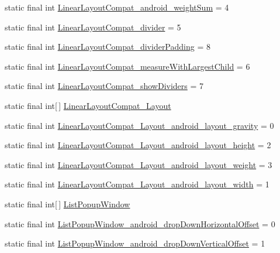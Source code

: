 \begin{CompactItemize}
\item 
static final int \hyperlink{classandroid_1_1support_1_1v4_1_1_r_1_1styleable_8f749702d3ee9fc29c39a04661dd9b91}{LinearLayoutCompat\_\-android\_\-weightSum} = 4
\item 
static final int \hyperlink{classandroid_1_1support_1_1v4_1_1_r_1_1styleable_678fcd55c5a19e3fde49a5ec33331fd9}{LinearLayoutCompat\_\-divider} = 5
\item 
static final int \hyperlink{classandroid_1_1support_1_1v4_1_1_r_1_1styleable_00ee5a3b1918e743d8959a4de0289516}{LinearLayoutCompat\_\-dividerPadding} = 8
\item 
static final int \hyperlink{classandroid_1_1support_1_1v4_1_1_r_1_1styleable_8b8d65edcdf29ccafcc0df613960971f}{LinearLayoutCompat\_\-measureWithLargestChild} = 6
\item 
static final int \hyperlink{classandroid_1_1support_1_1v4_1_1_r_1_1styleable_fe02967a715f53721d56bd6750def3f6}{LinearLayoutCompat\_\-showDividers} = 7
\item 
static final int\mbox{[}$\,$\mbox{]} \hyperlink{classandroid_1_1support_1_1v4_1_1_r_1_1styleable_a8dc84dfe6c307db75f05c4257866884}{LinearLayoutCompat\_\-Layout}
\item 
static final int \hyperlink{classandroid_1_1support_1_1v4_1_1_r_1_1styleable_5ffdb7df8cf149a63ae42570644268fc}{LinearLayoutCompat\_\-Layout\_\-android\_\-layout\_\-gravity} = 0
\item 
static final int \hyperlink{classandroid_1_1support_1_1v4_1_1_r_1_1styleable_eafec718baa0f8681ec6643c6cd2e749}{LinearLayoutCompat\_\-Layout\_\-android\_\-layout\_\-height} = 2
\item 
static final int \hyperlink{classandroid_1_1support_1_1v4_1_1_r_1_1styleable_b4af83ad77725822d082552796d2bfae}{LinearLayoutCompat\_\-Layout\_\-android\_\-layout\_\-weight} = 3
\item 
static final int \hyperlink{classandroid_1_1support_1_1v4_1_1_r_1_1styleable_133e851e27e11681c8f244c2550bc0a7}{LinearLayoutCompat\_\-Layout\_\-android\_\-layout\_\-width} = 1
\item 
static final int\mbox{[}$\,$\mbox{]} \hyperlink{classandroid_1_1support_1_1v4_1_1_r_1_1styleable_a0e1ff67246990456b474c947ecb8b7e}{ListPopupWindow}
\item 
static final int \hyperlink{classandroid_1_1support_1_1v4_1_1_r_1_1styleable_2e96b042761bd1aeda203521812c584e}{ListPopupWindow\_\-android\_\-dropDownHorizontalOffset} = 0
\item 
static final int \hyperlink{classandroid_1_1support_1_1v4_1_1_r_1_1styleable_692ddd2493fa2024e43c7709cf955596}{ListPopupWindow\_\-android\_\-dropDownVerticalOffset} = 1

\end{CompactItemize}
